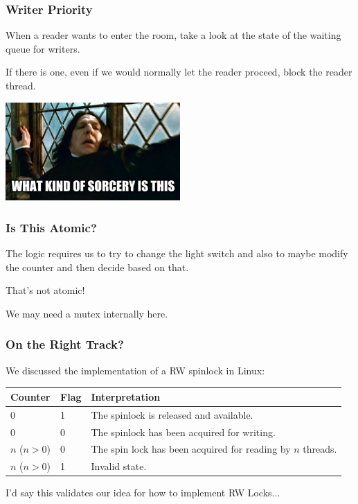 \begin{frame}
\frametitle{Writer Priority}

When a reader wants to enter the room, take a look at the state of the waiting queue for writers. 

If there is one, even if we would normally let the reader proceed, block the reader thread.

\begin{center}
	\includegraphics[width=0.5\textwidth]{images/sorcery.jpg}
\end{center}

\end{frame}

\begin{frame}
\frametitle{Is This Atomic?}

The logic requires us to try to change the light switch and also to maybe modify the counter and then decide based on that.

That's not atomic!

We may need a mutex internally here.

\end{frame}

\begin{frame}
\frametitle{On the Right Track?}

 We discussed the implementation of a RW spinlock in Linux:

\begin{center}
	\begin{tabular}{l|l|l}
		\textbf{Counter} & \textbf{Flag} & \textbf{Interpretation}                                     \\\hline
		0                & 1             & The spinlock is released and available.                     \\
		0                & 0             & The spinlock has been acquired for writing.                 \\
		$n$ ($n > 0$)    & 0             & The spin lock has been acquired for reading by $n$ threads. \\
		$n$ ($n > 0$)    & 1             & Invalid state.                                              \\
	\end{tabular}
\end{center}

I'd say this validates our idea for how to implement RW Locks...

\end{frame}



